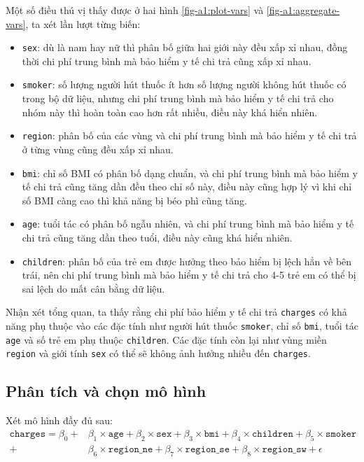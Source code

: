 Một số điều thú vị thấy được ở hai hình \ref{fig-a1:plot-vars} và \ref{fig-a1:aggregate-vars}, ta xét lần lượt từng biến:
\begin{itemize}
	\item \texttt{sex}: dù là nam hay nữ thì phân bố giữa hai giới này đều xấp xỉ nhau, đồng thời chi phí trung bình mà bảo hiểm y tế chi trả cũng xấp xỉ nhau.
	\item \texttt{smoker}: số lượng người hút thuốc ít hơn số lượng người không hút thuốc có trong bộ dữ liệu, nhưng chi phí trung bình mà bảo hiểm y tế chi trả cho nhóm này thì hoàn toàn cao hơn rất nhiều, điều này khá hiển nhiên.
	\item \texttt{region}: phân bố của các vùng và chi phí trung bình mà bảo hiểm y tế chi trả ở từng vùng cũng đều xấp xỉ nhau. 
	\item \texttt{bmi}: chỉ số BMI có phân bố dạng chuẩn, và chi phí trung bình mà bảo hiểm y tế chi trả cũng tăng dần đều theo chỉ số này, điều này cũng hợp lý vì khi chỉ số BMI càng cao thì khả năng bị béo phì cũng tăng. 
	\item \texttt{age}: tuổi tác có phân bố ngẫu nhiên, và chi phí trung bình mà bảo hiểm y tế chi trả cũng tăng dần theo tuổi, điều này cũng khá hiển nhiên.
	\item \texttt{children}: phân bố của trẻ em được hưởng theo bảo hiểm bị lệch hẳn về bên trái, nên chi phí trung bình mà bảo hiểm y tế chi trả cho 4-5 trẻ em có thể bị sai lệch do mất cân bằng dữ liệu.
\end{itemize}

Nhận xét tổng quan, ta thấy rằng chi phí bảo hiểm y tế chi trả \texttt{charges} có khả năng phụ thuộc vào các đặc tính như người hút thuốc \texttt{smoker}, chỉ số \texttt{bmi}, tuổi tác \texttt{age} và số trẻ em phụ thuộc \texttt{children}. Các đặc tính còn lại như vùng miền \texttt{region} và giới tính \texttt{sex} có thể sẽ không ảnh hưởng nhiều đến \texttt{charges}.

\subsection*{Phân tích và chọn mô hình}

Xét mô hình đầy đủ sau:
\begin{equation}\label{a1-model-full}
	\begin{split}
		\texttt{charges} = \beta_0 + &\beta_1 \times \texttt{age} + \beta_2 \times \texttt{sex} + \beta_3 \times \texttt{bmi} + \beta_4 \times \texttt{children} + \beta_5 \times \texttt{smoker}\\ + &\beta_6 \times \texttt{region\_ne} + \beta_7 \times \texttt{region\_se} + \beta_8 \times \texttt{region\_sw} + \epsilon
	\end{split}
\end{equation}

